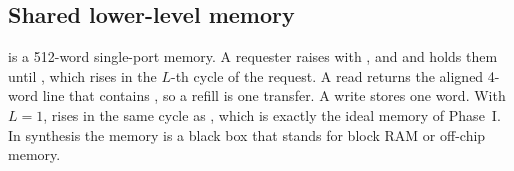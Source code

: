 \subsection{Shared lower-level memory}
 is a 512-word single-port memory. A requester raises  with
,  and  and holds them until , which rises in the $L$-th
cycle of the request. A read returns the aligned 4-word line that contains , so a
refill is one transfer. A write stores one word. With $L=1$,  rises in the same cycle
as , which is exactly the ideal memory of Phase~I. In synthesis the memory is a black
box that stands for block RAM or off-chip memory.
